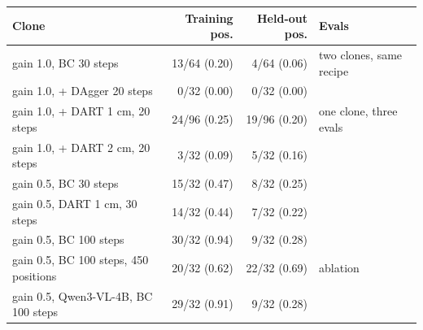\begin{tabular}{lrrl}
\toprule
Clone & Training pos. & Held-out pos. & Evals \\
\midrule
gain 1.0, BC 30 steps & 13/64 (0.20) & 4/64 (0.06) & two clones, same recipe \\
gain 1.0, + DAgger 20 steps & 0/32 (0.00) & 0/32 (0.00) &  \\
gain 1.0, + DART 1 cm, 20 steps & 24/96 (0.25) & 19/96 (0.20) & one clone, three evals \\
gain 1.0, + DART 2 cm, 20 steps & 3/32 (0.09) & 5/32 (0.16) &  \\
gain 0.5, BC 30 steps & 15/32 (0.47) & 8/32 (0.25) &  \\
gain 0.5, DART 1 cm, 30 steps & 14/32 (0.44) & 7/32 (0.22) &  \\
gain 0.5, BC 100 steps & 30/32 (0.94) & 9/32 (0.28) &  \\
gain 0.5, BC 100 steps, 450 positions & 20/32 (0.62) & 22/32 (0.69) & ablation \\
gain 0.5, Qwen3-VL-4B, BC 100 steps & 29/32 (0.91) & 9/32 (0.28) &  \\
\bottomrule
\end{tabular}
